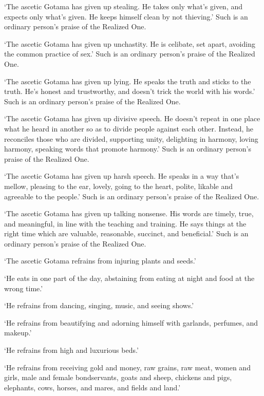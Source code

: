 \documentclass[12pt,openany]{book}%
\begin{document}
‘The ascetic Gotama has given up stealing. He takes only what’s given, and expects only what’s given. He keeps himself clean by not thieving.’ Such is an ordinary person’s praise of the Realized One. 

‘The ascetic Gotama has given up unchastity. He is celibate, set apart, avoiding the common practice of sex.’ Such is an ordinary person’s praise of the Realized One. 

‘The ascetic Gotama has given up lying. He speaks the truth and sticks to the truth. He’s honest and trustworthy, and doesn’t trick the world with his words.’ Such is an ordinary person’s praise of the Realized One. 

‘The ascetic Gotama has given up divisive speech. He doesn’t repeat in one place what he heard in another so as to divide people against each other. Instead, he reconciles those who are divided, supporting unity, delighting in harmony, loving harmony, speaking words that promote harmony.’ Such is an ordinary person’s praise of the Realized One. 

‘The ascetic Gotama has given up harsh speech. He speaks in a way that’s mellow, pleasing to the ear, lovely, going to the heart, polite, likable and agreeable to the people.’ Such is an ordinary person’s praise of the Realized One. 

‘The ascetic Gotama has given up talking nonsense. His words are timely, true, and meaningful, in line with the teaching and training. He says things at the right time which are valuable, reasonable, succinct, and beneficial.’ Such is an ordinary person’s praise of the Realized One. 

‘The ascetic Gotama refrains from injuring plants and seeds.’ 

‘He eats in one part of the day, abstaining from eating at night and food at the wrong time.’ 

‘He refrains from dancing, singing, music, and seeing shows.’ 

‘He refrains from beautifying and adorning himself with garlands, perfumes, and makeup.’ 

‘He refrains from high and luxurious beds.’ 

‘He refrains from receiving gold and money, raw grains, raw meat, women and girls, male and female bondservants, goats and sheep, chickens and pigs, elephants, cows, horses, and mares, and fields and land.’ 
\end{document}
